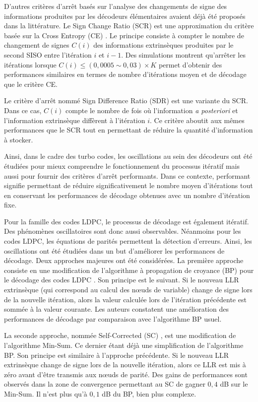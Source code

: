 D'autres critères d'arrêt basés sur l'analyse des changements de signe des informations produites par les décodeurs 
élémentaires avaient déjà été proposés dans la littérature. Le Sign Change Ratio (SCR) \cite{fossorier_scr} est une 
approximation du critère basée sur la Cross Entropy (CE) \cite{hagenauer_ce}. Le principe consiste à compter le nombre de 
changement de signes $C(i)$ des informations extrinsèques produites par le second SISO entre l'itération $i$ et $i-1$. 
Des simulations montrent qu'arrêter les itérations lorsque $C(i)\leq (0,0005 \sim 0,03)\times K$ permet d'obtenir des 
performances similaires en termes de nombre d'itérations moyen et de décodage que le critère CE.

Le critère d'arrêt nommé Sign Difference Ratio (SDR) \cite{fossorier_scr} est une variante du SCR. Dans ce cas, $C(i)$ 
compte le nombre de fois où l'information \textit{a posteriori} et l'information extrinsèque diffèrent à l'itération $i$. 
Ce critère aboutit aux mêmes performances que le SCR tout en permettant de réduire la quantité d'information à stocker.

Ainsi, dans le cadre des turbo codes, les oscillations au sein des décodeurs ont été étudiées pour mieux comprendre le 
fonctionnement du processus itératif mais aussi pour fournir des critères d'arrêt performants. Dans ce contexte, performant 
signifie permettant de réduire significativement le nombre moyen d'itérations tout en conservant les performances de 
décodage obtenues avec un nombre d'itération fixe.

Pour la famille des codes LDPC, le processus de décodage est également itératif. Des phénomènes oscillatoires sont donc aussi 
observables. Néanmoins pour les codes LDPC, les équations de parités permettent la détection d'erreurs. Ainsi, 
les oscillations ont été étudiées dans un but d'améliorer les performances de décodage. Deux approches majeures ont été 
considérées. La première approche consiste en une modification de l'algorithme à propagation de croyance (BP) pour le 
décodage des codes LDPC \cite{gounai_bp_osc}. Son principe est le suivant. Si le nouveau LLR extrinsèque (qui correspond 
au calcul des nœuds de variable) change de signe lors de la nouvelle itération, alors la valeur calculée lors de 
l'itération précédente est sommée à la valeur courante. Les auteurs constatent une amélioration des performances de décodage par 
comparaison avec l'algorithme BP usuel.

La seconde approche, nommée Self-Corrected (SC) \cite{savin_sc}, est une modification de l'algorithme Min-Sum. Ce dernier 
étant déjà une simplification de l'algorithme BP. Son principe est similaire à l'approche précédente. Si le nouveau LLR 
extrinsèque change de signe lors de la nouvelle itération, alors ce LLR est mis à zéro avant d'être transmis aux nœuds de 
parité. Des gains de performances sont observés dans la zone de convergence permettant au SC de gagner $0,4$ dB sur le 
Min-Sum. Il n'est plus qu'à $0,1$ dB du BP, bien plus complexe.

